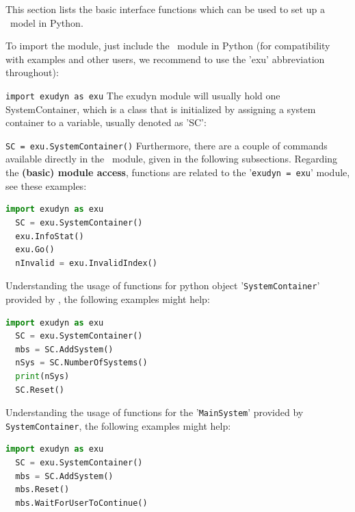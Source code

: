\documentclass[11pt,a4paper]{book} %
\begin{document}
\newpage

\pagestyle{plain}
%
\tableofcontents


\clearpage
{} 
\setcounter{page}{0}









This section lists the basic interface functions which can be used to set up a \codeName\ model in Python.

To import the module, just include the \codeName\ module in Python (for compatibility with examples and other users, we recommend to use the 'exu' abbreviation throughout):
\bi
  \item[] \texttt{import exudyn as exu}
\ei
The exudyn module will usually hold one SystemContainer, which is a class that is initialized by assigning a system container to a variable, usually denoted as 'SC':
\bi
  \item[] \texttt{SC = exu.SystemContainer()}
\ei
Furthermore, there are a couple of commands available directly in the \codeName\ module, given in the following subsections.
Regarding the {\bf (basic) module access}, functions are related to the '\texttt{exudyn = exu}' module, see these examples:
\begin{lstlisting}[language=Python, firstnumber=14]
  import exudyn as exu
  SC = exu.SystemContainer()
  exu.InfoStat() 
  exu.Go()
  nInvalid = exu.InvalidIndex()
\end{lstlisting} \vspace{12pt}
%
Understanding the usage of functions for python object '\texttt{SystemContainer}' provided by \codeName, the following examples might help:
\begin{lstlisting}[language=Python, firstnumber=14]
  import exudyn as exu
  SC = exu.SystemContainer()
  mbs = SC.AddSystem()
  nSys = SC.NumberOfSystems()
  print(nSys)
  SC.Reset()
\end{lstlisting} \vspace{12pt}
%
Understanding the usage of functions for the '\texttt{MainSystem}' provided by \texttt{SystemContainer}, the following examples might help:
\begin{lstlisting}[language=Python, firstnumber=14]
  import exudyn as exu
  SC = exu.SystemContainer()
  mbs = SC.AddSystem()
  mbs.Reset()
  mbs.WaitForUserToContinue() 
\end{lstlisting} \vspace{12pt}
%
\end{document}
